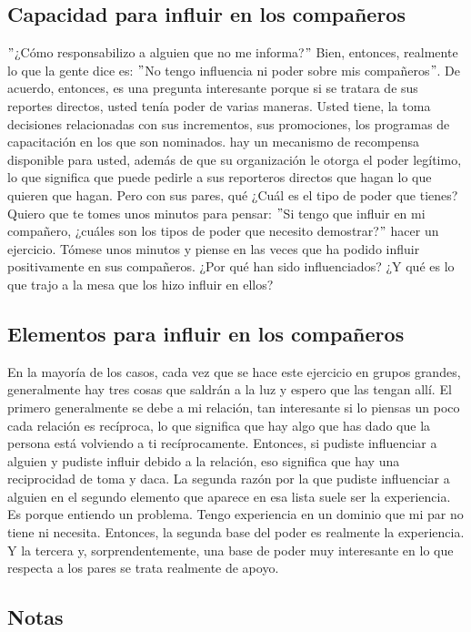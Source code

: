 \documentclass[10pt]{book}
\begin{document}
\subsection{Capacidad para influir en los compañeros}
$"$¿Cómo responsabilizo a alguien que no me informa?$"$ Bien, entonces, realmente lo que la gente dice es: $"$No tengo influencia ni poder sobre mis compañeros$"$. De acuerdo, entonces, es una pregunta interesante porque si se tratara de sus reportes directos, usted tenía poder de varias maneras. Usted tiene, la toma decisiones relacionadas con sus incrementos, sus promociones, los programas de capacitación en los que son nominados. hay un mecanismo de recompensa disponible para usted, además de que su organización le otorga el poder legítimo, lo que significa que puede pedirle a sus reporteros directos que hagan lo que quieren que hagan. Pero con sus pares, qué ¿Cuál es el tipo de poder que tienes? Quiero que te tomes unos minutos para pensar: $"$Si tengo que influir en mi compañero, ¿cuáles son los tipos de poder que necesito demostrar?$"$ hacer un ejercicio. Tómese unos minutos y piense en las veces que ha podido influir positivamente en sus compañeros. ¿Por qué han sido influenciados? ¿Y qué es lo que trajo a la mesa que los hizo influir en ellos?
\subsection{Elementos para influir en los compañeros}
En la mayoría de los casos, cada vez que se hace este ejercicio en grupos grandes, generalmente hay tres cosas que saldrán a la luz y espero que las tengan allí. El primero generalmente se debe a mi relación, tan interesante si lo piensas un poco cada relación es recíproca, lo que significa que hay algo que has dado que la persona está volviendo a ti recíprocamente. Entonces, si pudiste influenciar a alguien y pudiste influir debido a la relación, eso significa que hay una reciprocidad de toma y daca. La segunda razón por la que pudiste influenciar a alguien en el segundo elemento que aparece en esa lista suele ser la experiencia. Es porque entiendo un problema. Tengo experiencia en un dominio que mi par no tiene ni necesita. Entonces, la segunda base del poder es realmente la experiencia. Y la tercera y, sorprendentemente, una base de poder muy interesante en lo que 
respecta a los pares se trata realmente de apoyo.
\subsection{Notas}
\end{document}
